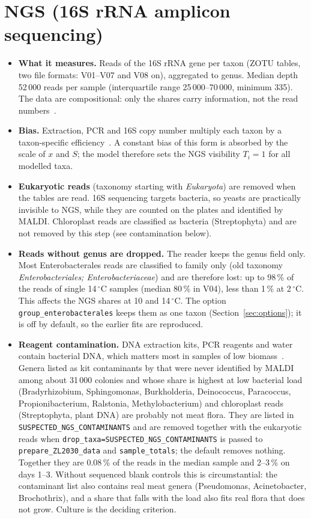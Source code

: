 \documentclass[11pt,a4paper]{article}
\newcommand{\code}[1]{\texttt{#1}}
\begin{document}
\section{NGS (16S rRNA amplicon sequencing)}\label{sec:ngs}

\begin{itemize}
\item \textbf{What it measures.} Reads of the 16S rRNA gene per taxon (ZOTU tables, two file formats: V01--V07 and V08 on), aggregated to genus. Median depth 52\,000 reads per sample (interquartile range 25\,000--70\,000, minimum 335). The data are compositional: only the shares carry information, not the read numbers~\cite{gloor_microbiome_2017}.
\item \textbf{Bias.} Extraction, PCR and 16S copy number multiply each taxon by a taxon-specific efficiency~\cite{mclarenConsistentCorrectable2019}. A constant bias of this form is absorbed by the scale of $x$ and $S$; the model therefore sets the NGS visibility $T_i = 1$ for all modelled taxa.
\item \textbf{Eukaryotic reads} (taxonomy starting with \emph{Eukaryota}) are removed when the tables are read. 16S sequencing targets bacteria, so yeasts are practically invisible to NGS, while they are counted on the plates and identified by MALDI. Chloroplast reads are classified as bacteria (Streptophyta) and are not removed by this step (see contamination below).
\item \textbf{Reads without genus are dropped.} The reader keeps the genus field only. Most Enterobacterales reads are classified to family only (old taxonomy \emph{Enterobacteriales; Enterobacteriaceae}) and are therefore lost: up to 98\,\% of the reads of single 14\,$^\circ$C samples (median 80\,\% in V04), less than 1\,\% at 2\,$^\circ$C. This affects the NGS shares at 10 and 14\,$^\circ$C. The option \code{group\_enterobacterales} keeps them as one taxon (Section~\ref{sec:options}); it is off by default, so the earlier fits are reproduced.
\item \textbf{Reagent contamination.} DNA extraction kits, PCR reagents and water contain bacterial DNA, which matters most in samples of low biomass~\cite{salter_reagent_2014}. Genera listed as kit contaminants by \textcite{salter_reagent_2014} that were never identified by MALDI among about 31\,000 colonies and whose share is highest at low bacterial load (Bradyrhizobium, Sphingomonas, Burkholderia, Deinococcus, Paracoccus, Propionibacterium, Ralstonia, Methylobacterium) and chloroplast reads (Streptophyta, plant DNA) are probably not meat flora. They are listed in \code{SUSPECTED\_NGS\_CONTAMINANTS} and are removed together with the eukaryotic reads when \code{drop\_taxa=SUSPECTED\_NGS\_CONTAMINANTS} is passed to \code{prepare\_ZL2030\_data} and \code{sample\_totals}; the default removes nothing. Together they are 0.08\,\% of the reads in the median sample and 2--3\,\% on days 1--3. Without sequenced blank controls this is circumstantial: the contaminant list also contains real meat genera (Pseudomonas, Acinetobacter, Brochothrix), and a share that falls with the load also fits real flora that does not grow. Culture is the deciding criterion.
\end{itemize}
\end{document}
